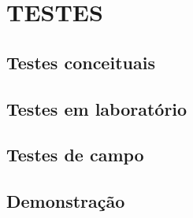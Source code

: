 \chapter{TESTES}
\label{chap:testes}

\section{Testes conceituais}
\label{sec:tstconc}

\section{Testes em laboratório}
\label{sec:tstlab}

\section{Testes de campo}
\label{sec:tstcamp}

\section{Demonstração}
\label{sec:tstconcl}



